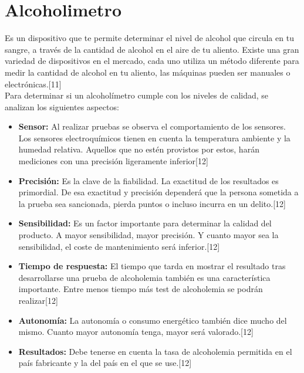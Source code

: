 \section{Alcoholimetro}
Es un dispositivo que te permite determinar el nivel de alcohol que circula en tu sangre, a través de la cantidad de alcohol en el aire de tu aliento. Existe una gran variedad de dispositivos en el mercado, cada uno utiliza un método diferente para medir la cantidad de alcohol en tu aliento, las máquinas pueden ser manuales o electrónicas.[11] \\
Para determinar si un alcoholímetro cumple con los niveles de calidad, se analizan los siguientes aspectos:
\begin{itemize}
    \item \textbf{Sensor:} Al realizar pruebas se observa el comportamiento de los sensores. Los sensores electroquímicos tienen en cuenta la temperatura ambiente y la humedad relativa. Aquellos que no estén provistos por estos, harán mediciones con una precisión ligeramente inferior[12]
    \item \textbf{Precisión:} Es la clave de la fiabilidad. La exactitud de los resultados es primordial. De esa exactitud y precisión dependerá que la persona sometida a la prueba sea sancionada, pierda puntos o incluso incurra en un delito.[12]
    \item \textbf{Sensibilidad:} Es un factor importante para determinar la calidad del producto. A mayor sensibilidad, mayor precisión. Y cuanto mayor sea la sensibilidad, el coste de mantenimiento será inferior.[12]
    \item \textbf{Tiempo de respuesta:} El tiempo que tarda en mostrar el resultado tras desarrollarse una prueba de alcoholemia también es una característica importante. Entre menos tiempo más test de alcoholemia se podrán realizar[12]
    \item \textbf{Autonomía:} La autonomía o consumo energético también dice mucho del mismo. Cuanto mayor autonomía tenga, mayor será valorado.[12]
    \item \textbf{Resultados:} Debe tenerse en cuenta la tasa de alcoholemia permitida en el país fabricante y la del país en el que se use.[12]
\end{itemize}

